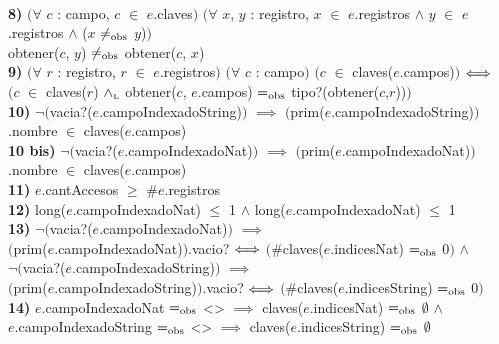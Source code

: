 \begin{Representacion}
    \noindent\tab\tab{}\\
    \noindent\tab\tab\textbf{8)} $\big(\forall$ $c$ : campo, $c$ $\in$ $e$.claves$\big)$ $\big(\forall$ $x$, $y$ : registro, $x$ $\in$ $e$.registros $\land$ $y$ $\in$ $e$.registros $\land$ ($x$ $\ne_{\mathrm{obs}}$ $y$)$\big)$ \\
    \noindent\tab\tab obtener($c$, $y$) $\ne_{\mathrm{obs}}$ obtener($c$, $x$)
    \\
    \noindent\tab\tab\textbf{9)} $\big(\forall$ $r$ : registro, $r$ $\in$ $e$.registros$\big)$ $\big(\forall$ $c$ : campo$\big)$ $\big(c$ $\in$ claves($e$.campos)$\big)$ $\Longleftrightarrow$ \\
    \noindent\tab\tab $\big(c$ $\in$ claves($r$) $\land_{\mathrm{\scriptscriptstyle{L}}}$ obtener($c$, $e$.campos) $=_{\mathrm{obs}}$ tipo?(obtener($c$,$r$))$\big)$
    \\
    \noindent\tab\tab\textbf{10)} $\neg\big($vacia?($e$.campoIndexadoString)$\big)$ $\implies$ $\big($prim($e$.campoIndexadoString)$\big)$.nombre $\in$ claves($e$.campos)\\
    \noindent\tab\tab\textbf{10 bis)} $\neg\big($vacia?($e$.campoIndexadoNat)$\big)$ $\implies$ $\big($prim($e$.campoIndexadoNat)$\big)$.nombre $\in$ claves($e$.campos)\\
    \noindent\tab\tab\textbf{11)} $e$.cantAccesos $\ge$ \#$e$.registros\\
    \noindent\tab\tab\textbf{12)} long($e$.campoIndexadoNat) $\le$ 1 $\land$ long($e$.campoIndexadoNat) $\le$ 1\\
    \noindent\tab\tab\textbf{13)} $\neg\big($vacia?($e$.campoIndexadoNat)$\big)$ $\implies$\\
    \noindent\tab\tab$\big($prim($e$.campoIndexadoNat)$\big)$.vacio? $\Longleftrightarrow$ $\big(\#$claves($e$.indicesNat) $=_{\mathrm{obs}}$ 0$\big)$ $\land$ \\
    \noindent\tab\tab $\neg\big($vacia?($e$.campoIndexadoString)$\big)$ $\implies$\\
    \noindent\tab\tab $\big($prim($e$.campoIndexadoString)$\big)$.vacio? $\Longleftrightarrow$ $\big(\#$claves($e$.indicesString) $=_{\mathrm{obs}}$ 0$\big)$\\
    \noindent\tab\tab\textbf{14)} $e$.campoIndexadoNat $=_{\mathrm{obs}}$ <> $\implies$ claves($e$.indicesNat) $=_{\mathrm{obs}}$ $\emptyset$ $\land$ \\
    \noindent\tab\tab $e$.campoIndexadoString $=_{\mathrm{obs}}$ <> $\implies$ claves($e$.indicesString) $=_{\mathrm{obs}}$ $\emptyset$


\end{Representacion}
